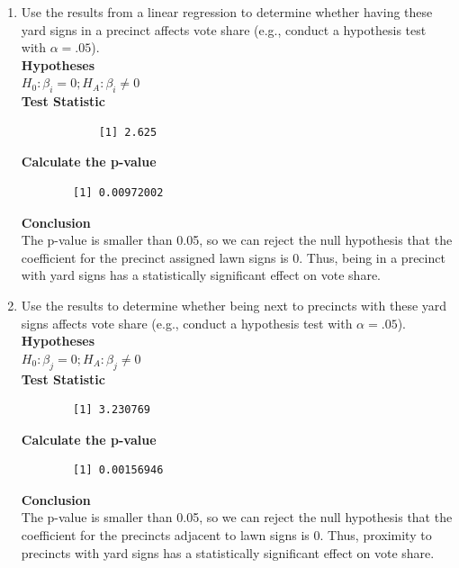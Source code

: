 \documentclass[12pt,letterpaper]{article}
\begin{document}
\vspace{.5cm}
\begin{enumerate}
	\item [(a)] Use the results from a linear regression to determine whether having these yard signs in a precinct affects vote share (e.g., conduct a hypothesis test with $\alpha = .05$). \\ [0.5 cm]
		\textbf{Hypotheses} \\[0.3cm]
		$ H_{0}: \beta_i= 0; H_{A}: \beta_i\neq 0$ \\ [0.3cm]
		\textbf{Test Statistic}
		
		\begin{verbatim}
			[1] 2.625
		\end{verbatim}
	\newpage		
		\textbf{Calculate the p-value}
	
	\begin{verbatim}
		[1] 0.00972002
	\end{verbatim}
		\textbf{Conclusion} \\[0.3cm]
		The p-value is smaller than 0.05, so we can reject the null hypothesis that the coefficient for the precinct assigned lawn signs is 0. Thus, being in a precinct with yard signs has a statistically significant effect on vote share. 
	\item [(b)]  Use the results to determine whether being
	next to precincts with these yard signs affects vote
	share (e.g., conduct a hypothesis test with $\alpha = .05$). \\[0.5cm]
	\textbf{Hypotheses} \\ [0.3cm]
	$ H_{0}: \beta_j= 0; H_{A}: \beta_j\neq 0$ \\ [0.3cm]
	\textbf{Test Statistic}
	
	\begin{verbatim}
		[1] 3.230769
	\end{verbatim}
	\textbf{Calculate the p-value}
	
	\begin{verbatim}
		[1] 0.00156946
	\end{verbatim}
		\textbf{Conclusion} \\[0.3cm]
		The p-value is smaller than 0.05, so we can reject the null hypothesis that the coefficient for the precincts adjacent to lawn signs is 0. Thus, proximity to precincts with yard signs has a statistically significant effect on vote share. 
	

\end{enumerate}
\end{document}
